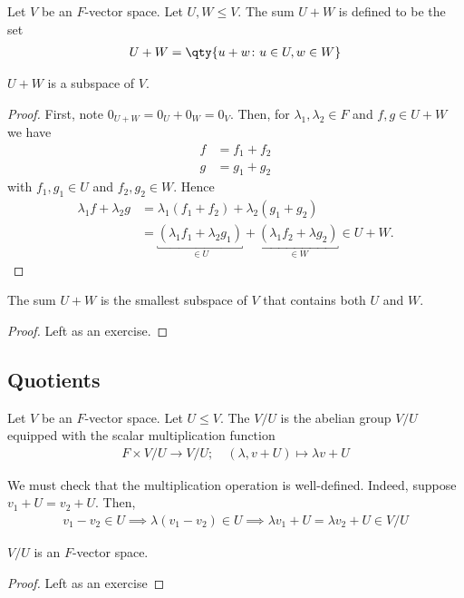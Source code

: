 \begin{definition}
    Let $V$ be an $F$-vector space.
    Let $U, W \leq V$.
    The sum $U + W$ is defined to be the set
    \begin{align*}
        U + W = \qty{ u + w \colon u \in U, w \in W }
    \end{align*}
\end{definition}
\begin{proposition}
    $U + W$ is a subspace of $V$.
\end{proposition}
\begin{proof}
    First, note $0_{U+W} = 0_U + 0_W = 0_V$.
    Then, for $\lambda_1, \lambda_2 \in F$ and $f, g \in U + W$ we have 
    \begin{align*}
        f &= f_1 + f_2 \\
        g &= g_1 + g_2
    \end{align*} with $f_1, g_1 \in U$ and $f_2, g_2 \in W$.
    Hence 
    \begin{align*}
        \lambda_1 f + \lambda_2 g &= \lambda_1 (f_1 + f_2) + \lambda_2 (g_1 + g_2) \\
        &= \underbracket{(\lambda_1 f_1 + \lambda_2 g_1)}_{\in U} + \underbracket{(\lambda_1 f_2 + \lambda g_2)}_{\in W} \in U + W.
    \end{align*} 
\end{proof}

\begin{proposition}
    The sum $U + W$ is the smallest subspace of $V$ that contains both $U$ and $W$.
\end{proposition}

\begin{proof}
    Left as an exercise.
\end{proof} 

\subsection{Quotients}
\begin{definition}[Quotient]
    Let $V$ be an $F$-vector space.
    Let $U \leq V$.
    The  $V / U$ is the abelian group $V / U$ equipped with the scalar multiplication function
    \begin{align*}
        F \times V / U \to V / U;\quad (\lambda, v + U) \mapsto \lambda v + U
    \end{align*}
\end{definition}

\begin{note}
    We must check that the multiplication operation is well-defined.
    Indeed, suppose $v_1 + U = v_2 + U$.
    Then,
    \begin{align*}
        v_1 - v_2 \in U \implies \lambda (v_1 - v_2) \in U \implies \lambda v_1 + U = \lambda v_2 + U \in V / U
    \end{align*}
\end{note} 
\begin{proposition}
    $V / U$ is an $F$-vector space.
\end{proposition}
\begin{proof}
    Left as an exercise        
\end{proof}


